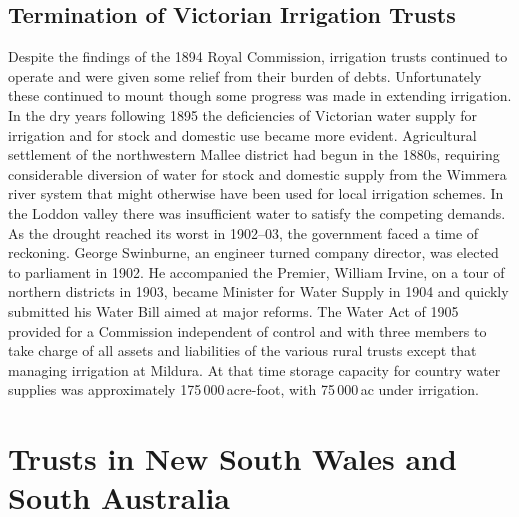 \subsection*{Termination of Victorian Irrigation Trusts}

Despite the findings of the 1894 Royal Commission, irrigation trusts
continued to operate and were given some relief from their burden of
debts.  Unfortunately these continued to mount though some progress
was made in extending irrigation.  In the dry years following 1895 the
deficiencies of Victorian water supply for irrigation and for stock
and domestic use became more evident.  Agricultural settlement of the
northwestern Mallee district had begun in the 1880s, requiring
considerable diversion of water for stock and domestic supply from the
Wimmera river system that might otherwise have been used for local
irrigation schemes.  In the Loddon valley there was insufficient water
to satisfy the competing demands.  As the drought reached its worst in
1902--03, the government faced a time of reckoning.  George Swinburne,
an engineer turned company director, was elected to parliament in
1902.  He accompanied the Premier, William Irvine, on a tour of
northern districts in 1903, became Minister for Water Supply in 1904
and quickly submitted his Water Bill aimed at major reforms.  The
Water Act of 1905 provided for a Commission independent of control and
with three members to take charge of all assets and liabilities of the
various rural trusts except that managing irrigation at Mildura.  At
that time storage capacity for country water supplies was
approximately 175\,000\,acre-foot, with 75\,000\,ac under
irrigation.

\section*{Trusts in New South Wales and South Australia}

